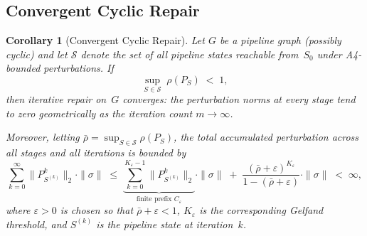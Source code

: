 \documentclass[11pt,a4paper]{article}
\newtheorem{corollary}[theorem]{Corollary}
\theoremstyle{definition}
\newcommand{\specnorm}[1]{\|#1\|_2}
\newcommand{\propmat}{P}
\begin{document}
\subsection{Convergent Cyclic Repair}

\begin{corollary}[Convergent Cyclic Repair]\label{cor:spectral-converge}
Let $G$ be a pipeline graph (possibly cyclic) and let $\mathcal{S}$ denote the
set of all pipeline states reachable from~$S_0$ under A4-bounded perturbations.
If
\begin{equation}\label{eq:uniform-spectral-bound}
  \sup_{S \in \mathcal{S}}\; \rho(\propmat_S) \;<\; 1,
\end{equation}
then iterative repair on~$G$ converges: the perturbation norms at every
stage tend to zero geometrically as the iteration count $m \to \infty$.

Moreover, letting $\bar{\rho} = \sup_{S \in \mathcal{S}} \rho(\propmat_S)$,
the total accumulated perturbation across all stages and all iterations is
bounded by
\begin{equation}\label{eq:total-accum}
  \sum_{k=0}^{\infty} \specnorm{\propmat_{S^{(k)}}^k} \cdot \|\sigma\|
  \;\leq\;
  \underbrace{\sum_{k=0}^{K_\varepsilon - 1}
    \specnorm{\propmat_{S^{(k)}}^k}}_{\text{finite prefix } C_\varepsilon}
  \cdot \|\sigma\|
  \;+\;
  \frac{(\bar{\rho} + \varepsilon)^{K_\varepsilon}}{1 - (\bar{\rho} + \varepsilon)}
  \cdot \|\sigma\|
  \;<\; \infty,
\end{equation}
where $\varepsilon > 0$ is chosen so that $\bar{\rho} + \varepsilon < 1$,
$K_\varepsilon$ is the corresponding Gelfand threshold, and $S^{(k)}$ is
the pipeline state at iteration~$k$.
\end{corollary}
\end{document}
